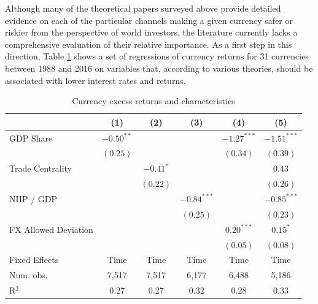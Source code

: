 \documentclass{ar-1col}
\begin{document}
Although many of the theoretical papers surveyed above provide detailed evidence on each of the particular channels making a given currency safer or riskier from the perspective of world investors, the literature currently lacks a comprehensive evaluation of their relative importance. As a first step in this direction, Table \ref{table:rx_char} shows a set of regressions of currency returns for 31 currencies between 1988 and 2016 on variables that, according to various theories, should be associated with lower interest rates and returns. 
\begin{table}[htp]
\begin{center}
\caption{Currency excess returns and characteristics}
\label{table:rx_char}
\vspace{1em}
\begin{tabular}{l c c c c c }
\hline
\hline
 & (1) & (2) & (3) & (4) & (5) \\
\hline
GDP Share               & $-0.50^{**}$ &             &               & $-1.27^{***}$ & $-1.51^{***}$ \\
                        & $(0.25)$     &             &               & $(0.34)$      & $(0.39)$      \\
Trade Centrality              &              & $-0.41^{*}$ &               &               & $0.43$        \\
                        &              & $(0.22)$    &               &               & $(0.26)$      \\
NIIP / GDP              &              &             & $-0.84^{***}$ &               & $-0.85^{***}$ \\
                        &              &             & $(0.25)$      &               & $(0.23)$      \\
FX Allowed Deviation         &              &             &               & $0.20^{***}$  & $0.15^{*}$    \\
                        &              &             &               & $(0.05)$      & $(0.08)$      \\
\hline
Fixed Effects & Time & Time & Time & Time & Time \\
Num. obs.     & 7,517        & 7,517     & 6,177          & 6,488          & 5,186          \\
R$^2$         & 0.27        & 0.27     & 0.32          & 0.28          & 0.33          \\
\hline
\hline
\end{tabular}
\end{center}

\end{table}
\end{document}

